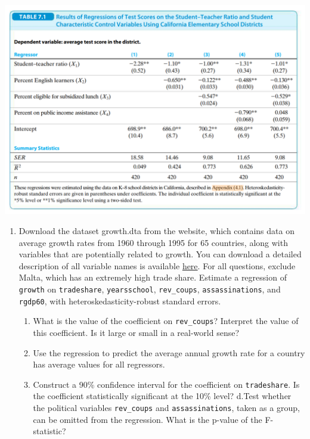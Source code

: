 \documentclass[
]{article}
\providecommand{\tightlist}{%
  \setlength{\itemsep}{0pt}\setlength{\parskip}{0pt}}
\begin{document}
\centering\includegraphics[scale=0.5]{materials/sw7-1.png}

\begin{enumerate}
\def\labelenumi{\arabic{enumi}.}
\setcounter{enumi}{5}
\tightlist
\item
  Download the dataset {growth.dta} from the website, which
  contains data on average growth rates from 1960 through 1995 for 65
  countries, along with variables that are potentially related to
  growth. You can download a detailed description of all variable names
  is available
  \href{https://www.princeton.edu/~mwatson/Stock-Watson_3u/Students/EE_Datasets/Growth_Description.pdf}{here}.
  For all questions, exclude Malta, which has an extremely high trade
  share. Estimate a regression of \texttt{growth} on
  \texttt{tradeshare}, \texttt{yearsschool}, \texttt{rev\_coups},
  \texttt{assassinations}, and \texttt{rgdp60}, with
  heteroskedasticity-robust standard errors.

  \begin{enumerate}
  \def\labelenumii{\alph{enumii}.}
  \tightlist
  \item
    What is the value of the coefficient on \texttt{rev\_coups}?
    Interpret the value of this coefficient. Is it large or small in a
    real-world sense?
  \item
    Use the regression to predict the average annual growth rate for a
    country has average values for all regressors.
  \item
    Construct a 90\% confidence interval for the coefficient on
    \texttt{tradeshare}. Is the coefficient statistically significant at
    the 10\% level? d.Test whether the political variables
    \texttt{rev\_coups} and \texttt{assassinations}, taken as a group,
    can be omitted from the regression. What is the p-value of the
    F-statistic?
  \end{enumerate}
\end{enumerate}
\end{document}
